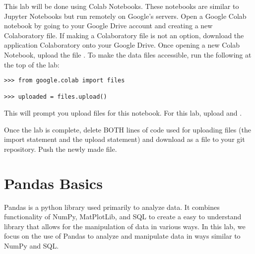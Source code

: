 \label{lab:pandas1}


\begin{info}
This lab will be done using Colab Notebooks.
These notebooks are similar to Jupyter Notebooks but run remotely on Google's servers.
Open a Google Colab notebook by going to your Google Drive account and creating a new Colaboratory file.
If making a Colaboratory file is not an option, download the application Colaboratory onto your Google Drive.
Once opening a new Colab Notebook, upload the file .
To make the data files accessible, run the following at the top of the lab:
\begin{lstlisting}
>>> from google.colab import files

>>> uploaded = files.upload()
\end{lstlisting}
This will prompt you upload files for this notebook.
For this lab, upload  and .

Once the lab is complete, delete BOTH lines of code used for uploading files (the import statement and the upload statement) and download as a  file to your git repository.
Push the newly made  file.
\end{info}

\section*{Pandas Basics}

Pandas is a python library used primarily to analyze data.
It combines functionality of NumPy, MatPlotLib, and SQL to create a easy to understand library that allows for the manipulation of data in various ways.
In this lab, we focus on the use of Pandas to analyze and manipulate data in ways similar to NumPy and SQL.

